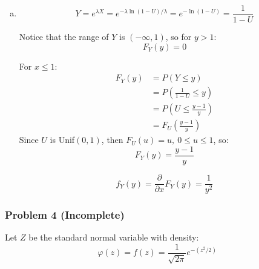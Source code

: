 \documentclass[11pt]{extarticle}
\begin{document}
\begin{enumerate}[(a)]
\begin{proof}
$$ f_X(x) = \frac{\partial}{\partial x} F_X(x) = \lambda e^{- \lambda x} $$


Mean: $$ \mu = E(X) = \int_{0}^{\infty} x f_X(x) dx = \int_{0}^{\infty} x \lambda e^{- \lambda x} dx  $$ 
$$ =  -x e^{-\lambda x}\Big|_0^\infty + \frac{-1}{\lambda} e^{-\lambda x} \Big|^\infty_0 = \boxed{\frac{1}{\lambda} } $$

Variance: $$ \sigma^2 = Var(X) = E(X^2) - E(X)^2  $$ $$=  \left( \int_{0}^{\infty} x^2 \lambda e^{- \lambda x} dx  \right) - \left( \frac{1}{\lambda} \right)^2 $$ 

$$ = \left( \frac{2}{\lambda^2} \right)  - \left( \frac{1}{\lambda} \right)^2 = \boxed{\frac{1}{\lambda^2}} $$


\end{proof}

\item $$Y = e^{\lambda X} =  e^{-\lambda \ln(1-U)/\lambda} = e^{-\ln(1-U)} = \frac{1}{1-U}$$

Notice that the range of $Y$ is $(-\infty, 1)$, so for $y > 1$: $$ F_Y(y) = 0$$

For $x \leq 1$: \begin{equation} 
\begin{split} F_Y(y) & =  P(Y \leq y) \\ 
& = P \left( \frac{1}{1-U} \leq y \right)  \\
& = P \left( U  \leq \frac{y-1}{y} \right)  \\
& = F_U \left( \frac{y-1}{y} \right)
\end{split}
\end{equation}
 Since $U$ is Unif$(0, 1)$, then $ F_U(u) = u,\ 0 \leq u \leq 1 $, so: $$ \boxed{F_Y(y)  = \frac{y-1}{y} } $$ 

$$ \boxed{f_Y(y) = \frac{\partial}{\partial x} F_Y(y) = \frac{1}{y^2}} $$

\end{enumerate}

\subsubsection*{Problem 4 (Incomplete)}

Let $Z$ be the standard normal variable with density:$$ \varphi(z) =  f(z) =  \frac{1}{\sqrt{2 \pi}} e^{-(z^2/2)} $$
\end{document}
